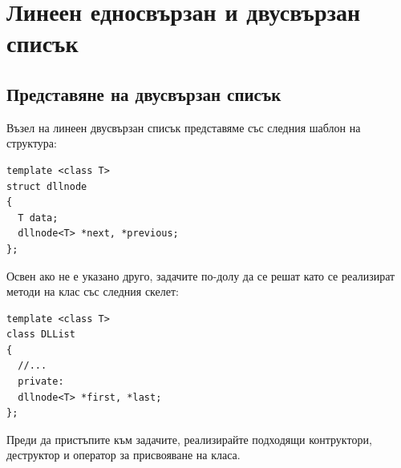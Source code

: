 \clearpage\section {Линеен едносвързан и двусвързан списък}

\subsection {Представяне на двусвързан списък}

\begin{mdframed}[hidealllines=true,backgroundcolor=gray!20]
Възел на линеен двусвързан списък представяме със следния шаблон на структура:
\begin{verbatim}
template <class T>
struct dllnode
{
  T data;
  dllnode<T> *next, *previous;
};
\end{verbatim}
Освен ако не е указано друго, задачите по-долу да се решат като се реализират методи на клас  със следния скелет:
\begin{verbatim}
template <class T>
class DLList
{
  //...
  private:
  dllnode<T> *first, *last;
};
\end{verbatim}
Преди да пристъпите към задачите, реализирайте подходящи контруктори, деструктор и оператор за присвояване на класа.
\end{mdframed}

